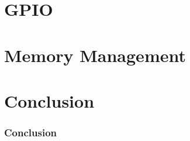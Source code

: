 \documentclass{beamer}
\begin{document}


\begin{frame}
\frametitle{ }
\end{frame}

\section{GPIO}
\subsection{ }

\begin{frame}
\frametitle{ }
\end{frame}

\section{Memory Management}
\subsection{ }
\begin{frame}
  \frametitle{}
\end{frame}

\let\origaddtocontents=\addtocontents
\def\dontaddtocontents#1#2{}
\let\addtocontents=\dontaddtocontents
\section*{Conclusion}
\let\addtocontents=\origaddtocontents

\begin{frame}
  \frametitle{Conclusion}
\end{frame}
\end{document}
